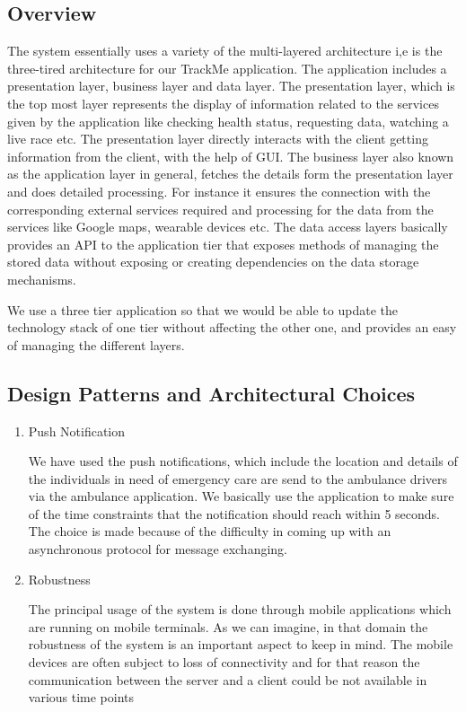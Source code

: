 \subsection{Overview}

\qquad The system essentially uses a variety of the multi-layered architecture i,e is the three-tired architecture for our TrackMe application. The application includes a presentation layer, business layer and data layer. The presentation layer, which is the top most layer represents the  display of information related to the services given by the application like checking health status, requesting data, watching a live race etc. The presentation layer directly interacts with the client getting information from the client, with the help of GUI. The business layer also known as the application layer in general, fetches the details form the presentation layer and does detailed processing. For instance it ensures the connection with the corresponding external services required and processing for the data from the services like Google maps, wearable devices etc. The data access layers basically provides an API to the application tier that exposes methods of managing the stored data without exposing or creating dependencies on the data storage mechanisms.

\par We use a three tier application so that we would be able to update the technology stack of one tier without affecting the other one, and provides an easy of managing the different layers.

\subsection{Design Patterns and Architectural Choices}
\begin{enumerate}
\item Push Notification
\par We have used the push notifications, which include the location and details of the individuals in need of emergency care are send to the ambulance drivers via the ambulance application. We basically use the application to make sure of the time constraints that the notification should reach within 5 seconds. The choice is made because of the difficulty in coming up with an asynchronous protocol for message exchanging.
\item Robustness 
\par The principal usage of the system is done through mobile applications which are running on mobile terminals. As we can imagine, in that domain the robustness of the system is an important aspect to keep in
mind. The mobile devices are often subject to loss of connectivity and for that reason the communication between the server and a client could be not available in various time points
\end{enumerate}


